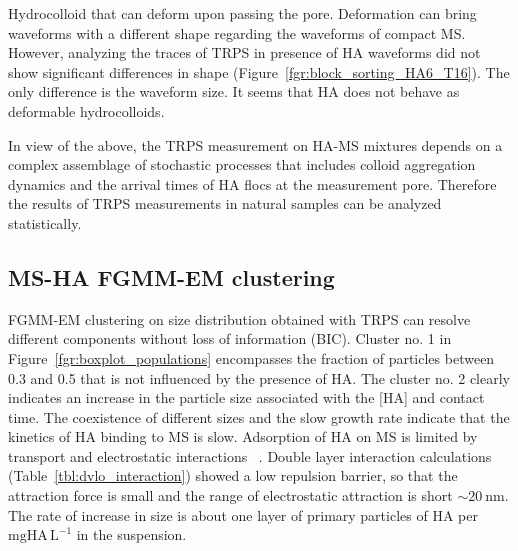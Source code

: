 \documentclass[journal=langd5,manuscript=article]{achemso}
\begin{document}
Hydrocolloid that can deform  upon  passing the pore\cite{Pevarnik2013}. Deformation can bring waveforms with a different shape regarding the waveforms of compact MS. However, analyzing the traces of TRPS in presence of HA waveforms did not show significant differences in shape (Figure~\ref{fgr:block_sorting_HA6_T16}). The only  difference is the waveform size. It seems that HA does not behave as deformable hydrocolloids.

In view of the above, the TRPS measurement on HA-MS mixtures depends on a complex assemblage of stochastic processes that includes colloid aggregation dynamics and the arrival times of HA flocs at the measurement pore. Therefore the results of TRPS measurements in natural samples can be analyzed statistically.





\subsection{MS-HA FGMM-EM clustering}



FGMM-EM clustering on size distribution obtained with TRPS can resolve different components without loss of information (BIC). Cluster no. 1 in 
Figure~\ref{fgr:boxplot_populations}
encompasses the fraction of particles between 0.3 and 0.5
that is not influenced by the presence of HA.
The cluster no. 2 clearly indicates an increase in the particle size associated with the [HA] and
contact time. The coexistence of different sizes and the
slow  growth rate indicate that the kinetics of HA binding
to MS is slow. Adsorption of HA on MS is limited by
transport and electrostatic interactions~ \cite{doi:10.1021/es981236u}.
Double layer interaction calculations (Table~\ref{tbl:dvlo_interaction}) showed a low  repulsion barrier,
so that the attraction force is small and the range of electrostatic attraction is short $\sim 20~\mathrm{nm}$.
The rate of increase in size is about one  layer of primary particles of HA per $\mathrm{mg HA\,L^{-1}}$ in the suspension.
\end{document}
